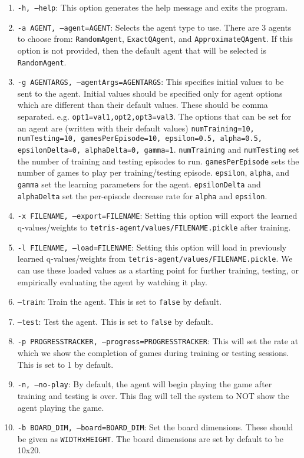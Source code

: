 \documentclass[11pt]{article}
\begin{document}
\begin{enumerate}
    \item \texttt{-h, --help}: This option generates the help message and exits the program.
    \item \texttt{-a AGENT, --agent=AGENT}: Selects the agent type to use. There are 3 agents to choose from: \texttt{RandomAgent}, \texttt{ExactQAgent}, and \texttt{ApproximateQAgent}. If this option is not provided, then the default agent that will be selected is \texttt{RandomAgent}.
    \item \texttt{-g AGENTARGS, --agentArgs=AGENTARGS}: This specifies initial values to be sent to the agent. Initial values should be specified only for agent options which are different than their default values. These should be comma separated. e.g. \texttt{opt1=val1,opt2,opt3=val3}. The options that can be set for an agent are (written with their default values) \texttt{numTraining=10, numTesting=10, gamesPerEpisode=10, epsilon=0.5, alpha=0.5, epsilonDelta=0, alphaDelta=0, gamma=1}. \texttt{numTraining} and \texttt{numTesting} set the number of training and testing episodes to run. \texttt{gamesPerEpisode} sets the number of games to play per training/testing episode. \texttt{epsilon}, \texttt{alpha}, and \texttt{gamma} set the learning parameters for the agent. \texttt{epsilonDelta} and \texttt{alphaDelta} set the per-episode decrease rate for \texttt{alpha} and \texttt{epsilon}.
    \item \texttt{-x FILENAME, --export=FILENAME}: Setting this option will export the learned q-values/weights to \texttt{tetris-agent/values/FILENAME.pickle} after training.
    \item \texttt{-l FILENAME, --load=FILENAME}: Setting this option will load in previously learned q-values/weights from \texttt{tetris-agent/values/FILENAME.pickle}. We can use these loaded values as a starting point for further training, testing, or empirically evaluating the agent by watching it play.
    \item \texttt{--train}: Train the agent. This is set to \texttt{false} by default.
    \item \texttt{--test}: Test the agent. This is set to \texttt{false} by default.
    \item \texttt{-p PROGRESSTRACKER, --progress=PROGRESSTRACKER}: This will set the rate at which we show the completion of games during training or testing sessions. This is set to 1 by default.
    \item \texttt{-n, --no-play}: By default, the agent will begin playing the game after training and testing is over. This flag will tell the system to NOT show the agent playing the game.
    \item \texttt{-b BOARD\_DIM, --board=BOARD\_DIM}: Set the board dimensions. These should be given as \texttt{WIDTHxHEIGHT}. The board dimensions are set by default to be 10x20.
\end{enumerate}
\end{document}
